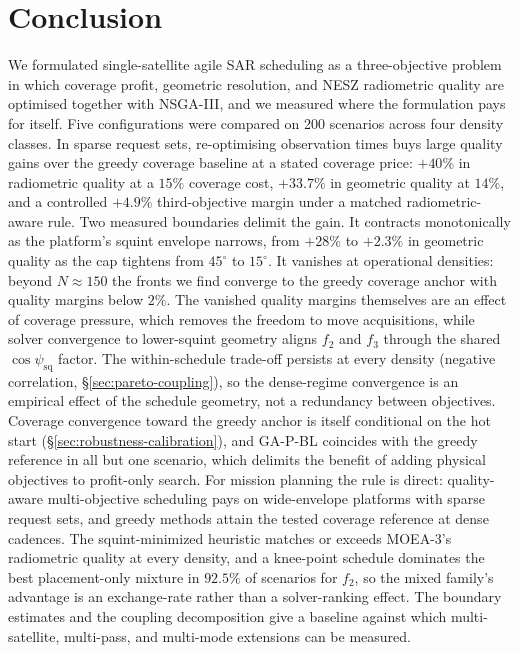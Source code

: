 \documentclass[preprint,12pt,authoryear]{elsarticle}
\begin{document}
\section{Conclusion}
We formulated single-satellite agile SAR scheduling as a three-objective
problem in which coverage profit, geometric resolution, and NESZ radiometric
quality are optimised together with NSGA-III, and we measured where the
formulation pays for itself. Five configurations were compared on 200
scenarios across four density classes.
In sparse request sets, re-optimising observation times buys large quality
gains over the greedy coverage baseline at a stated coverage price: $+40\%$ in radiometric quality at a $15\%$
coverage cost, $+33.7\%$ in geometric quality at $14\%$, and a controlled
$+4.9\%$ third-objective margin under a matched radiometric-aware rule.
Two measured boundaries delimit the gain. It contracts monotonically as the
platform's squint envelope narrows, from $+28\%$ to $+2.3\%$ in geometric
quality as the cap tightens from $45^\circ$ to $15^\circ$. It vanishes at
operational densities: beyond $N \approx 150$ the fronts we find converge to the
greedy coverage anchor with quality margins below $2\%$. The vanished quality
margins themselves are an effect of coverage pressure, which removes the
freedom to move acquisitions, while solver convergence to lower-squint
geometry aligns $f_2$ and $f_3$ through the shared $\cos\psi_{\text{sq}}$
factor. The within-schedule trade-off persists at every
density (negative correlation, \S\ref{sec:pareto-coupling}), so the dense-regime
convergence is an empirical effect of the schedule geometry, not a redundancy
between objectives. Coverage convergence toward the greedy anchor is itself
conditional on the hot start (\S\ref{sec:robustness-calibration}), and GA-P-BL
coincides with the greedy reference in all but one scenario, which delimits the
benefit of adding physical objectives to profit-only search.
For mission planning the rule is direct: quality-aware multi-objective
scheduling pays on wide-envelope platforms with sparse request sets, and greedy
methods attain the tested coverage reference at dense cadences. The
squint-minimized heuristic matches or exceeds MOEA-3's radiometric quality at
every density, and a knee-point schedule dominates the best placement-only
mixture in $92.5\%$ of scenarios for $f_2$, so the mixed family's advantage is
an exchange-rate rather than a solver-ranking effect. The boundary
estimates and the coupling decomposition give a baseline against which
multi-satellite, multi-pass, and multi-mode extensions can be measured.
\end{document}
